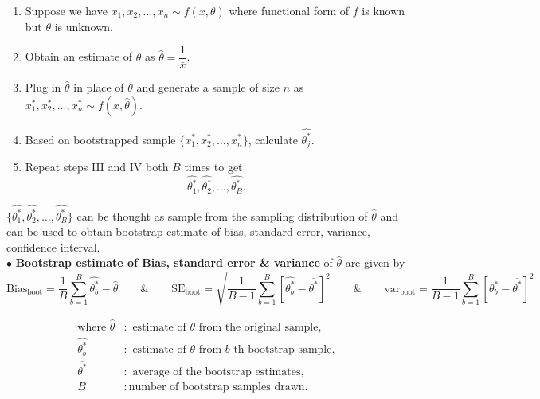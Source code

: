 \documentclass[11pt, a4paper]{article}\usepackage[]{graphicx}\usepackage[]{xcolor}
\begin{document}
\begin{enumerate}[Step I.]
\item Suppose we have $x_1, x_2, \ldots, x_n \sim f(x, \theta)$ where functional form of $f$ is known but $\theta$ is unknown.

\item Obtain an estimate of $\theta$ as $\hat{\theta} = \dfrac{1}{\bar{x}}$.

\item Plug in $\hat{\theta}$ in place of $\theta$ and generate a sample of size $n$ as $x_1^*, x_2^*, \ldots, x_n^* \sim f(x, \hat{\theta})$.

\item Based on bootstrapped sample $\{x_1^*, x_2^*, \ldots, x_n^*\}$, calculate $\widehat{\theta_{j}^{*}}$.

\item Repeat steps III and IV both $B$ times to get $$\widehat{\theta_{1}^{*}}, \widehat{\theta_{2}^{*}}, \ldots, \widehat{\theta_{B}^{*}}.$$
\end{enumerate}

$\{\widehat{\theta_{1}^{*}}, \widehat{\theta_{2}^{*}}, \ldots, \widehat{\theta_{B}^{*}}\}$ can be thought as sample from the sampling distribution of $\hat{\theta}$ and can be used to obtain bootstrap estimate of bias, standard error, variance, confidence interval. \\[0.3em]

$\bullet$ \textbf{Bootstrap estimate of Bias, standard error \& variance} of $\hat{\theta}$ are given by $$\text{Bias}_{\text{boot}} = \dfrac{1}{B} \sum \limits_{b = 1}^{B} \widehat{\theta_{b}^{*}} - \hat{\theta} \qquad \& \qquad \text{SE}_{\text{boot}} = \sqrt{\dfrac{1}{B-1} \sum \limits_{b = 1}^{B} \left[\widehat{\theta_{b}^{*}} - \overline{\theta^*}\right]^2} \qquad \& \qquad \text{var}_{\text{boot}} = \dfrac{1}{B-1} \sum \limits_{b = 1}^{B} \left[\widehat{\theta_{b}^{*}} - \overline{\theta^*}\right]^2$$

\begin{align*}
\text{where } \hat{\theta} &: \text{ estimate of } \theta \text{ from the original sample}, \\[0.2em]
\widehat{\theta_{b}^{*}} &: \text{ estimate of } \theta \text{ from } b\text{-th bootstrap sample}, \\[0.2em]
\overline{\theta^*} &: \text{ average of the bootstrap estimates}, \\[0.2em]
B &: \text{number of bootstrap samples drawn}.
\end{align*}
\end{document}
